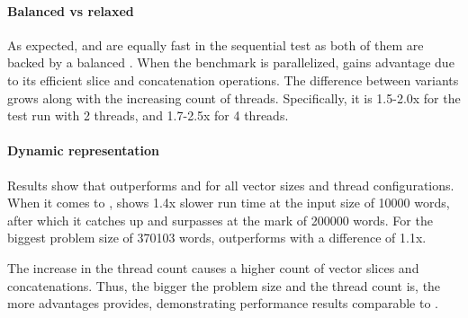 \paragraph{Balanced vs relaxed}
As expected, \rbvec{} and \rrbvec{} are equally fast in the sequential test as both of them are backed by a balanced \rbtree{}. When the benchmark is parallelized, \rrbvec{} gains advantage due to its efficient slice and concatenation operations. The difference between variants grows along with the increasing count of threads. Specifically, it is 1.5-2.0x for the test run with 2 threads, and 1.7-2.5x for 4 threads.

\paragraph{Dynamic representation}
Results show that \pvec{} outperforms \rbvec{} and \rrbvec{} for all vector sizes and thread configurations. When it comes to \stdvec{}, \pvec{} shows 1.4x slower run time at the input size of 10000 words, after which it catches up and surpasses \stdvec{} at the mark of 200000 words. For the biggest problem size of 370103 words, \pvec{} outperforms \stdvec{} with a difference of 1.1x. 

The increase in the thread count causes a higher count of vector slices and concatenations. Thus, the bigger the problem size and the thread count is, the more advantages \pvec{} provides, demonstrating performance results comparable to \stdvec{}. 

